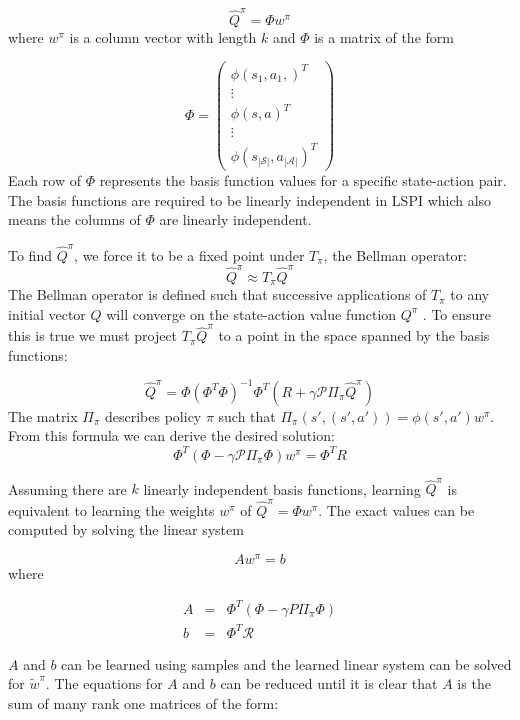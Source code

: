 \[
    \hat{Q}^\pi = \Phi w^\pi
\]
where $w^\pi$ is a column vector with length $k$ and $\Phi$ is a matrix of the form

\[
    \Phi = \begin{pmatrix}
        \phi(s_1,a_1,)^T \\ \vdots \\ \phi(s,a)^T \\ \vdots \\ \phi(s_{|\mathcal{S}|},a_{|\mathcal{A}|})^T
    \end{pmatrix}
\]
Each row of $\Phi$ represents the basis function values for a specific state-action pair. The basis functions are required to be linearly independent in LSPI which also means the columns of $\Phi$ are linearly independent.

To find $\hat{Q}^\pi$, we force it to be a fixed point under $T_\pi$, the Bellman operator:
\[
    \hat{Q}^\pi \approx T_\pi\hat{Q}^\pi
\]
The Bellman operator is defined such that successive applications of $T_\pi$ to any initial vector $Q$ will converge on the state-action value function $Q^\pi$ \cite{lspi}. To ensure this is true we must project $T_\pi\hat{Q}^\pi$ to a point in the space spanned by the basis functions:

\[
    \hat{Q}^\pi = \Phi(\Phi^T\Phi)^{-1}\Phi^T(R + \gamma \mathcal{P}\Pi_\pi\hat{Q}^\pi)
\]
The matrix $\Pi_\pi$ describes policy $\pi$ such that $\Pi_\pi(s',(s',a')) = \phi(s',a')w^\pi$. From this formula we can derive the desired solution:
\[
    \Phi^T(\Phi - \gamma \mathcal{P}\Pi_\pi\Phi)w^\pi = \Phi^TR
\]

Assuming there are $k$ linearly independent basis functions, learning $\hat{Q}^\pi$ is equivalent to learning the weights $w^\pi$ of $\hat{Q}^\pi = \Phi w^\pi$. The exact values can be computed by solving the linear system

\begin{equation}
    Aw^\pi = b
\end{equation}
where

\[
    \begin{array}{rcl}
        A &=& \Phi^T(\Phi - \gamma P\Pi_\pi\Phi) \\
        b &=& \Phi^T\mathcal{R}
    \end{array}
\]

$A$ and $b$ can be learned using samples and the learned linear system can be solved for $\tilde{w}^\pi$. The equations for $A$ and $b$ can be reduced until it is clear that $A$ is the sum of many rank one matrices of the form:

